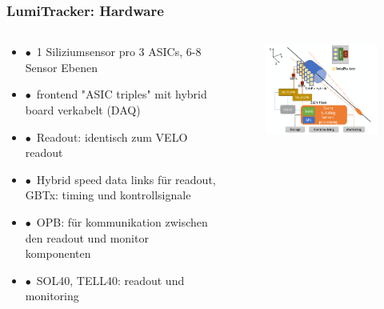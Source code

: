 \documentclass[aspectratio=1610, 12pt, xcolor=dvipsnames]{beamer}
\begin{document}
\begin{frame}\frametitle{LumiTracker: Hardware}
  \begin{columns}
    \begin{column}[c]{0.48\textwidth}
      \begin{itemize}
        \item $\bullet$\, 1 Siliziumsensor pro 3 ASICs, 6-8 Sensor Ebenen
        \item $\bullet$\, frontend "ASIC triples" mit hybrid board verkabelt (DAQ)
        \item $\bullet$\, Readout: identisch zum VELO readout
        \item $\bullet$\, Hybrid speed data links für readout, GBTx: timing und kontrollsignale
        \item $\bullet$\, OPB: für kommunikation zwischen den readout und monitor komponenten
        \item $\bullet$\, SOL40, TELL40: readout und monitoring
      \end{itemize}
    \end{column}
    \begin{column}[c]{0.48\textwidth}
      \begin{figure}
	       \centering
	       \includegraphics[width=\textwidth]{plots/lumi_design.png}
      \end{figure}
    \end{column}
  \end{columns}
\end{frame}
\end{document}
